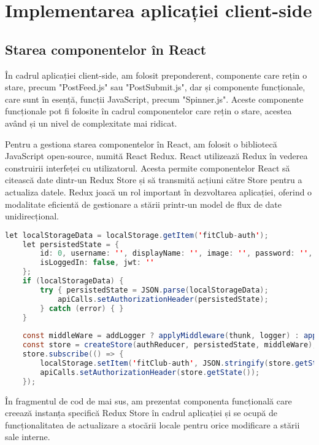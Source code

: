\section{Implementarea aplicației client-side}

\subsection{Starea componentelor în React}

În cadrul aplicației client-side, am folosit preponderent, componente care rețin o stare, precum "PostFeed.js" sau "PostSubmit.js", dar și componente funcționale, care sunt în esență, funcții JavaScript, precum "Spinner.js". Aceste componente funcționale pot fi folosite în cadrul componentelor care rețin o stare, acestea având și un nivel de complexitate mai ridicat.\newline

Pentru a gestiona starea componentelor în React, am folosit o bibliotecă JavaScript open-source, numită React Redux\cite{.reactreduxbook}. React utilizează Redux în vederea construirii interfeței cu utilizatorul. Acesta permite componentelor React să citească date dintr-un Redux Store și să transmită acțiuni către Store pentru a actualiza datele. Redux joacă un rol important în dezvoltarea aplicației, oferind o modalitate eficientă de gestionare a stării printr-un model de flux de date unidirecțional.\newline

\begin{lstlisting}[language=Java]
	let localStorageData = localStorage.getItem('fitClub-auth');
	let persistedState = {
		id: 0, username: '', displayName: '', image: '', password: '',
		isLoggedIn: false, jwt: '' 
	};
	if (localStorageData) {
		try { persistedState = JSON.parse(localStorageData);
			apiCalls.setAuthorizationHeader(persistedState);
		} catch (error) { }
	}
	
	const middleWare = addLogger ? applyMiddleware(thunk, logger) : applyMiddleware(thunk)
	const store = createStore(authReducer, persistedState, middleWare);
	store.subscribe(() => { 
		localStorage.setItem('fitClub-auth', JSON.stringify(store.getState()));
		apiCalls.setAuthorizationHeader(store.getState());
	});
\end{lstlisting}
\bigskip

În fragmentul de cod de mai sus, am prezentat componenta funcțională  care creează instanța specifică Redux Store în cadrul aplicației și se ocupă de funcționalitatea de actualizare a stocării locale pentru orice modificare a stării sale interne.\newline

